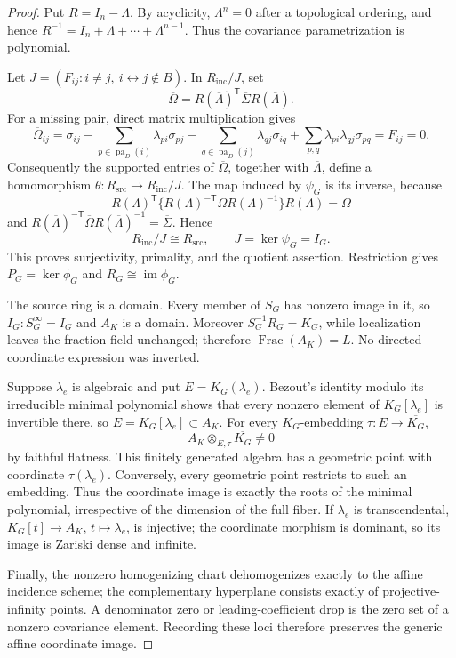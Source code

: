 \documentclass{article}
\begin{document}
\begin{proof}
Put \(R=I_n-\Lambda\). By acyclicity, \(\Lambda^n=0\) after a topological ordering, and hence \(R^{-1}=I_n+\Lambda+\cdots+\Lambda^{n-1}\). Thus the covariance parametrization is polynomial.

Let \(J=(F_{ij}:i\ne j,\ i\leftrightarrow j\notin B)\). In \(R_{\mathrm{inc}}/J\), set
\[
\overline\Omega=R(\overline\Lambda)^{\mathsf T}\overline\Sigma R(\overline\Lambda).
\]
For a missing pair, direct matrix multiplication gives
\[
\overline\Omega_{ij}=\sigma_{ij}
-\sum_{p\in\operatorname{pa}_D(i)}\lambda_{pi}\sigma_{pj}
-\sum_{q\in\operatorname{pa}_D(j)}\lambda_{qj}\sigma_{iq}
+\sum_{p,q}\lambda_{pi}\lambda_{qj}\sigma_{pq}=F_{ij}=0.
\]
Consequently the supported entries of \(\overline\Omega\), together with \(\overline\Lambda\), define a homomorphism \(\theta:R_{\mathrm{src}}\to R_{\mathrm{inc}}/J\). The map induced by \(\psi_G\) is its inverse, because
\[
R(\Lambda)^{\mathsf T}\{R(\Lambda)^{-\mathsf T}\Omega R(\Lambda)^{-1}\}R(\Lambda)=\Omega
\]
and \(R(\overline\Lambda)^{-\mathsf T}\overline\Omega R(\overline\Lambda)^{-1}=\overline\Sigma\). Hence
\[
R_{\mathrm{inc}}/J\cong R_{\mathrm{src}},\qquad J=\ker\psi_G=I_G.
\]
This proves surjectivity, primality, and the quotient assertion. Restriction gives \(P_G=\ker\phi_G\) and \(R_G\cong\operatorname{im}\phi_G\).

The source ring is a domain. Every member of \(S_G\) has nonzero image in it, so \(I_G:S_G^\infty=I_G\) and \(A_K\) is a domain. Moreover \(S_G^{-1}R_G=K_G\), while localization leaves the fraction field unchanged; therefore \(\operatorname{Frac}(A_K)=L\). No directed-coordinate expression was inverted.

Suppose \(\lambda_e\) is algebraic and put \(E=K_G(\lambda_e)\). Bezout's identity modulo its irreducible minimal polynomial shows that every nonzero element of \(K_G[\lambda_e]\) is invertible there, so \(E=K_G[\lambda_e]\subset A_K\). For every \(K_G\)-embedding \(\tau:E\to\overline{K_G}\),
\[
A_K\otimes_{E,\tau}\overline{K_G}\ne0
\]
by faithful flatness. This finitely generated algebra has a geometric point with coordinate \(\tau(\lambda_e)\). Conversely, every geometric point restricts to such an embedding. Thus the coordinate image is exactly the roots of the minimal polynomial, irrespective of the dimension of the full fiber. If \(\lambda_e\) is transcendental, \(K_G[t]\to A_K\), \(t\mapsto\lambda_e\), is injective; the coordinate morphism is dominant, so its image is Zariski dense and infinite.

Finally, the nonzero homogenizing chart dehomogenizes exactly to the affine incidence scheme; the complementary hyperplane consists exactly of projective-infinity points. A denominator zero or leading-coefficient drop is the zero set of a nonzero covariance element. Recording these loci therefore preserves the generic affine coordinate image.
\end{proof}
\end{document}
